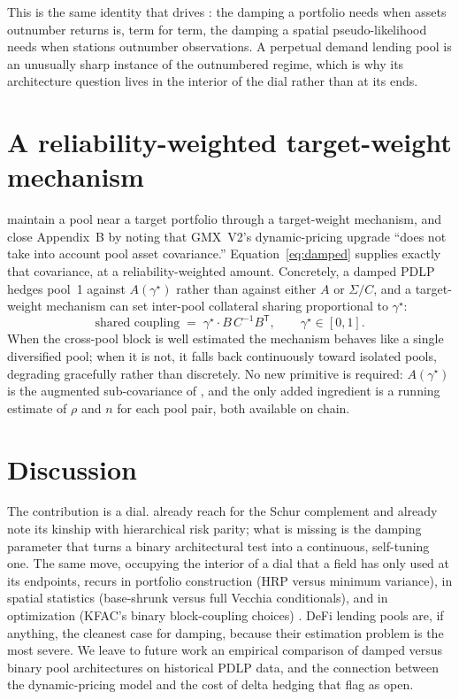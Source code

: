 \documentclass[11pt]{article}
\theoremstyle{definition}
\newcommand{\Sig}{\Sigma}
\newcommand{\T}{^{\mathsf{T}}}
\begin{document}
This is the same identity that drives \citet{cotton2026}: the damping a portfolio
needs when assets outnumber returns is, term for term, the damping a spatial
pseudo-likelihood needs when stations outnumber observations. A perpetual demand
lending pool is an unusually sharp instance of the outnumbered regime, which is
why its architecture question lives in the interior of the dial rather than at its
ends.

\section{A reliability-weighted target-weight mechanism}

\citet{chitra2025} maintain a pool near a target portfolio through a
target-weight mechanism, and close Appendix~B by noting that GMX~V2's
dynamic-pricing upgrade ``does not take into account pool asset covariance.''
Equation~\eqref{eq:damped} supplies exactly that covariance, at a
reliability-weighted amount. Concretely, a damped PDLP hedges pool~1 against
$A(\gamma^\star)$ rather than against either $A$ or $\Sig/C$, and a target-weight
mechanism can set inter-pool collateral sharing proportional to $\gamma^\star$:
\begin{equation}
  \text{shared coupling} \;=\; \gamma^\star \cdot B\,C^{-1}B\T,
  \qquad
  \gamma^\star \in [0,1].
\end{equation}
When the cross-pool block is well estimated the mechanism behaves like a single
diversified pool; when it is not, it falls back continuously toward isolated
pools, degrading gracefully rather than discretely. No new primitive is required:
$A(\gamma^\star)$ is the augmented sub-covariance of \citet{cotton2024}, and the
only added ingredient is a running estimate of $\rho$ and $n$ for each pool pair,
both available on chain.

\section{Discussion}

The contribution is a dial. \citet{chitra2025} already reach for the
Schur complement and already note its kinship with hierarchical risk parity; what
is missing is the damping parameter that turns a binary architectural test into a
continuous, self-tuning one. The same move, occupying the interior of a dial that
a field has only used at its endpoints, recurs in portfolio construction (HRP
versus minimum variance), in spatial statistics (base-shrunk versus full Vecchia
conditionals), and in optimization (KFAC's binary block-coupling choices)
\citep{cotton2024,cotton2026}. DeFi lending pools are, if anything, the cleanest
case for damping, because their estimation problem is the most severe. We leave to
future work an empirical comparison of damped versus binary pool architectures on
historical PDLP data, and the connection between the dynamic-pricing model and the
cost of delta hedging that \citet{chitra2025} flag as open.
\end{document}
